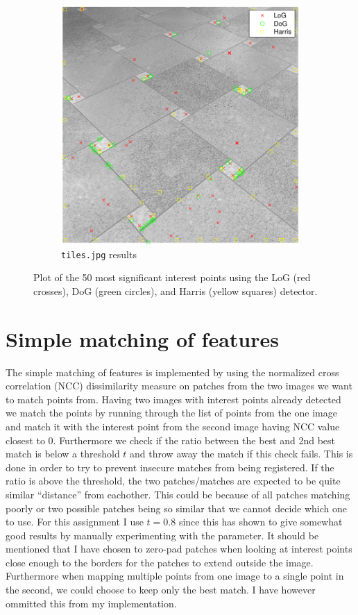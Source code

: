 \documentclass[11pt,a4paper]{article}
\begin{document}
\begin{figure}[h]
\begin{subfigure}[t]{0.8\textwidth}
        \includegraphics[width=\textwidth]{images/i4_points.pdf}
        \caption{\texttt{tiles.jpg} results}
        \label{fig:i4_points}
    \end{subfigure}
    \caption{Plot of the 50 most significant interest points using the LoG
    (red crosses), DoG (green circles), and Harris (yellow squares) detector.}
\end{figure}

\section{Simple matching of features}
The simple matching of features is implemented by using the normalized cross
correlation (NCC) dissimilarity measure on patches from the two images we want
to match points from. Having two images with interest points already detected
we match the points by running through the list of points from the one image
and match it with the interest point from the second image having NCC value
closest to 0. Furthermore we check if the ratio between the best and 2nd
best match is below a threshold $t$ and throw away the match if this check
fails. This is done in order to try to prevent insecure matches from being
registered. If the ratio is above the threshold, the two patches/matches
are expected to be quite similar ``distance'' from eachother. This could
be because of all patches matching poorly or two possible patches being so
similar that we cannot decide which one to use. For this assignment I use
$t = 0.8$ since this has shown to give somewhat good results by manually
experimenting with the parameter. It should be mentioned that I have chosen to
zero-pad patches when looking at interest points close enough to the borders for
the patches to extend outside the image. Furthermore when mapping multiple
points from one image to a single point in the second, we could choose to keep
only the best match. I have however ommitted this from my implementation.
\end{document}
